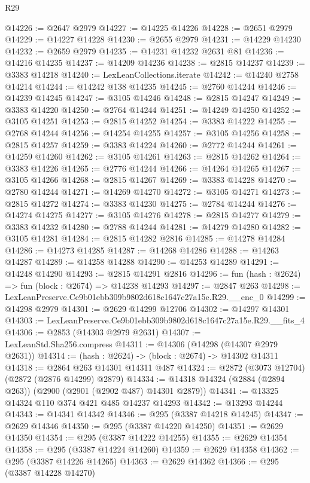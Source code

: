 \begin{lexlean}{R29}
\begin{coremodule}
@14226 := @2647 @2979
@14227 := @14225 @14226
@14228 := @2651 @2979
@14229 := @14227 @14228
@14230 := @2655 @2979
@14231 := @14229 @14230
@14232 := @2659 @2979
@14235 := @14231 @14232 @2631 @81
@14236 := @14216 @14235
@14237 := @14209 @14236
@14238 := @2815 @14237
@14239 := @3383 @14218
@14240 := LexLeanCollections.iterate
@14242 := @14240 @2758 @14214
@14244 := @14242 @138 @14235
@14245 := @2760 @14244
@14246 := @14239 @14245
@14247 := @3105 @14246
@14248 := @2815 @14247
@14249 := @3383 @14220
@14250 := @2764 @14244
@14251 := @14249 @14250
@14252 := @3105 @14251
@14253 := @2815 @14252
@14254 := @3383 @14222
@14255 := @2768 @14244
@14256 := @14254 @14255
@14257 := @3105 @14256
@14258 := @2815 @14257
@14259 := @3383 @14224
@14260 := @2772 @14244
@14261 := @14259 @14260
@14262 := @3105 @14261
@14263 := @2815 @14262
@14264 := @3383 @14226
@14265 := @2776 @14244
@14266 := @14264 @14265
@14267 := @3105 @14266
@14268 := @2815 @14267
@14269 := @3383 @14228
@14270 := @2780 @14244
@14271 := @14269 @14270
@14272 := @3105 @14271
@14273 := @2815 @14272
@14274 := @3383 @14230
@14275 := @2784 @14244
@14276 := @14274 @14275
@14277 := @3105 @14276
@14278 := @2815 @14277
@14279 := @3383 @14232
@14280 := @2788 @14244
@14281 := @14279 @14280
@14282 := @3105 @14281
@14284 := @2815 @14282 @2816
@14285 := @14278 @14284
@14286 := @14273 @14285
@14287 := @14268 @14286
@14288 := @14263 @14287
@14289 := @14258 @14288
@14290 := @14253 @14289
@14291 := @14248 @14290
@14293 := @2815 @14291 @2816
@14296 := fun (hash : @2624) => fun (block : @2674) => @14238 @14293
@14297 := @2847 @263
@14298 := LexLeanPreserve.Ce9b01ebb309b9802d618c1647c27a15e.R29.__enc_0
@14299 := @14298 @2979
@14301 := @2629 @14299 @12706
@14302 := @14297 @14301
@14303 := LexLeanPreserve.Ce9b01ebb309b9802d618c1647c27a15e.R29.__fits_4
@14306 := @2853 (@14303 @2979 @2631)
@14307 := LexLeanStd.Sha256.compress
@14311 := @14306 (@14298 (@14307 @2979 @2631))
@14314 := (hash : @2624) -> (block : @2674) -> @14302 @14311
@14318 := @2864 @263 @14301 @14311 @487
@14324 := @2872 (@3073 @12704) (@2872 (@2876 @14299) @2879)
@14334 := @14318 @14324 (@2884 (@2894 @263)) (@2900 (@2901 (@2902 @487) @14301 @2879))
@14341 := @13325 @14324 @110 @374 @421 @485 @14237 @14293
@14342 := @13293 @14244
@14343 := @14341 @14342
@14346 := @295 (@3387 @14218 @14245)
@14347 := @2629 @14346
@14350 := @295 (@3387 @14220 @14250)
@14351 := @2629 @14350
@14354 := @295 (@3387 @14222 @14255)
@14355 := @2629 @14354
@14358 := @295 (@3387 @14224 @14260)
@14359 := @2629 @14358
@14362 := @295 (@3387 @14226 @14265)
@14363 := @2629 @14362
@14366 := @295 (@3387 @14228 @14270)

\end{coremodule}
\end{lexlean}
